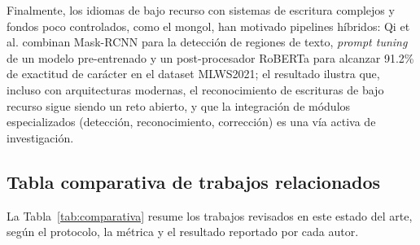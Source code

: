 \documentclass[conference]{IEEEtran}
\begin{document}
Finalmente, los idiomas de bajo recurso con sistemas de escritura complejos y fondos poco controlados, como el mongol, han motivado pipelines híbridos: Qi et al. \cite{pr2_2025} combinan Mask-RCNN para la detección de regiones de texto, \textit{prompt tuning} de un modelo pre-entrenado y un post-procesador RoBERTa para alcanzar 91.2\% de exactitud de carácter en el dataset MLWS2021; el resultado ilustra que, incluso con arquitecturas modernas, el reconocimiento de escrituras de bajo recurso sigue siendo un reto abierto, y que la integración de módulos especializados (detección, reconocimiento, corrección) es una vía activa de investigación.



\subsection{Tabla comparativa de trabajos relacionados}

La Tabla~\ref{tab:comparativa} resume los trabajos revisados en este estado
del arte, según el protocolo, la métrica y el resultado reportado por cada
autor.
\end{document}
